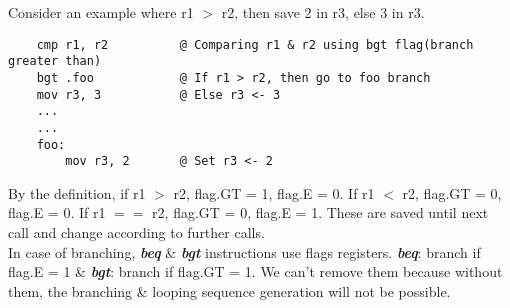 \documentclass[12pt]{article}
\begin{document}
Consider an example where r1 $>$ r2, then save 2 in r3, else 3 in r3.

\begin{verbatim}
    cmp r1, r2          @ Comparing r1 & r2 using bgt flag(branch greater than)
    bgt .foo            @ If r1 > r2, then go to foo branch
    mov r3, 3           @ Else r3 <- 3
    ...
    ...
    foo:
        mov r3, 2       @ Set r3 <- 2 
\end{verbatim}

By the definition, if r1 $>$ r2, flag.GT = 1, flag.E = 0. If r1 $<$ r2, flag.GT = 0, flag.E = 0. If r1 $==$ r2, flag.GT = 0, flag.E = 1. These are saved until next call and change according to further calls. \\

In case of branching, \textbf{\textit{beq}} \& \textbf{\textit{bgt}} instructions use flags registers. \textbf{\textit{beq}}: branch if flag.E = 1 \& \textbf{\textit{bgt}}: branch if flag.GT = 1.
We can't remove them because without them, the branching \& looping sequence generation will not be possible.
\end{document}

